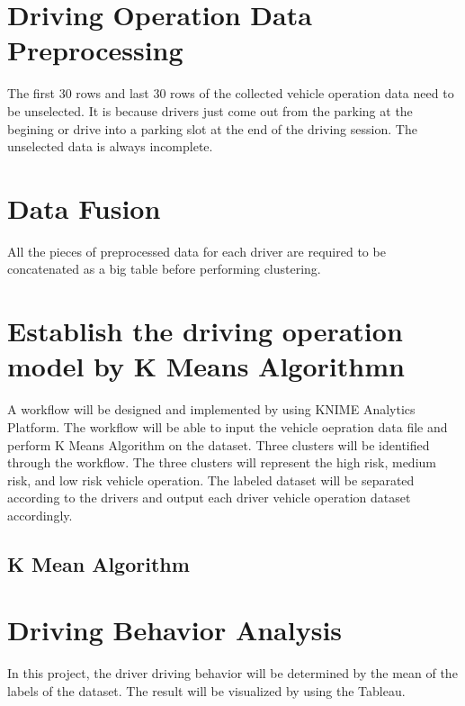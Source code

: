 \section{Driving Operation Data Preprocessing}
The first 30 rows and last 30 rows of the collected vehicle operation data need to be unselected. It is because drivers just come out from the parking at the begining or drive into a parking slot at the end of the driving session. The unselected data is always incomplete.

\section{Data Fusion}
All the pieces of preprocessed data for each driver are required to be concatenated as a big table before performing clustering.

\section{Establish the driving operation model by K Means Algorithmn}
A workflow will be designed and implemented by using KNIME Analytics Platform. The workflow will be able to input the vehicle oepration data file and perform K Means Algorithm on the dataset. Three clusters will be identified through the workflow. The three clusters will represent the high risk, medium risk, and low risk vehicle operation. The labeled dataset will be separated according to the drivers and output each driver vehicle operation dataset accordingly.  

\subsection{K Mean Algorithm}



\section{Driving Behavior Analysis}
In this project, the driver driving behavior will be determined by the mean of the labels of the dataset. The result will be visualized by using the Tableau.